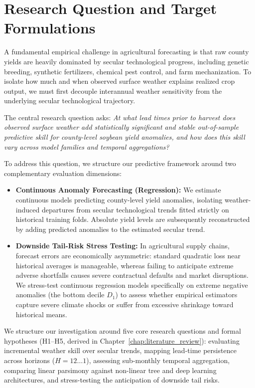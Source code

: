 \section{Research Question and Target Formulations}
\label{sec:intro_research_question}

A fundamental empirical challenge in agricultural forecasting is that raw county yields are heavily dominated by secular technological progress, including genetic breeding, synthetic fertilizers, chemical pest control, and farm mechanization. To isolate how much and when observed surface weather explains realized crop output, we must first decouple interannual weather sensitivity from the underlying secular technological trajectory.

The central research question asks: \textit{At what lead times prior to harvest does observed surface weather add statistically significant and stable out-of-sample predictive skill for county-level soybean yield anomalies, and how does this skill vary across model families and temporal aggregations?}

To address this question, we structure our predictive framework around two complementary evaluation dimensions:
\begin{itemize}
    \item \textbf{Continuous Anomaly Forecasting (Regression):} We estimate continuous models predicting county-level yield anomalies, isolating weather-induced departures from secular technological trends fitted strictly on historical training folds. Absolute yield levels are subsequently reconstructed by adding predicted anomalies to the estimated secular trend.
    \item \textbf{Downside Tail-Risk Stress Testing:} In agricultural supply chains, forecast errors are economically asymmetric: standard quadratic loss near historical averages is manageable, whereas failing to anticipate extreme adverse shortfalls causes severe contractual defaults and market disruptions. We stress-test continuous regression models specifically on extreme negative anomalies (the bottom decile $D_1$) to assess whether empirical estimators capture severe climate shocks or suffer from excessive shrinkage toward historical means.
\end{itemize}

We structure our investigation around five core research questions and formal hypotheses (H1--H5, derived in Chapter~\ref{chap:literature_review}): evaluating incremental weather skill over secular trends, mapping lead-time persistence across horizons ($H=12 \dots 1$), assessing sub-monthly temporal aggregation, comparing linear parsimony against non-linear tree and deep learning architectures, and stress-testing the anticipation of downside tail risks.

